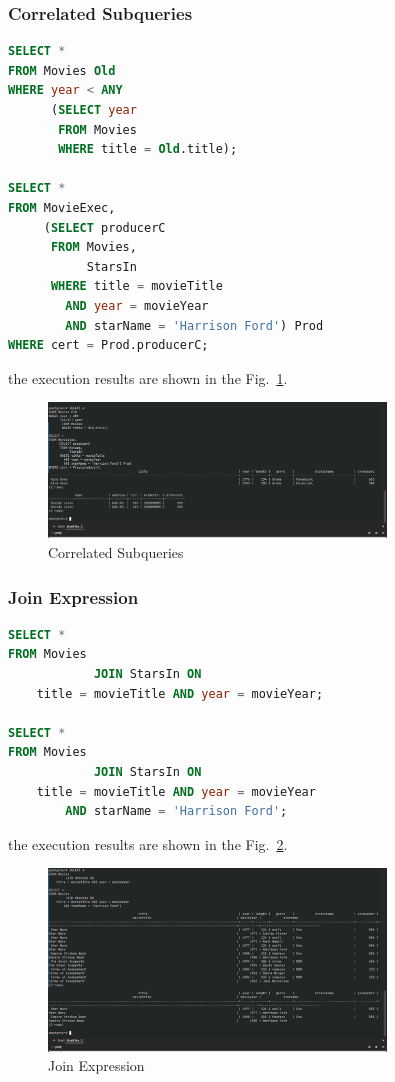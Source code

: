\documentclass{cshwk}
\begin{document}
\subsubsection{Correlated Subqueries}

\begin{lstlisting}[language=sql]
SELECT *
FROM Movies Old
WHERE year < ANY
      (SELECT year
       FROM Movies
       WHERE title = Old.title);

SELECT *
FROM MovieExec,
     (SELECT producerC
      FROM Movies,
           StarsIn
      WHERE title = movieTitle
        AND year = movieYear
        AND starName = 'Harrison Ford') Prod
WHERE cert = Prod.producerC;
\end{lstlisting}

the execution results are shown in the Fig.~\ref{fig:correlated-subqueries}.

\begin{figure}[H]
    \centering
    \includegraphics[width=0.8\textwidth]{hw5-9.png}
    \caption{Correlated Subqueries}
    \label{fig:correlated-subqueries}
\end{figure}

\subsubsection{Join Expression}

\begin{lstlisting}[language=sql]
SELECT *
FROM Movies
            JOIN StarsIn ON
    title = movieTitle AND year = movieYear;

SELECT *
FROM Movies
            JOIN StarsIn ON
    title = movieTitle AND year = movieYear
        AND starName = 'Harrison Ford';
\end{lstlisting}

the execution results are shown in the Fig.~\ref{fig:join-expression}.
\begin{figure}[H]
    \centering
    \includegraphics[width=0.8\textwidth]{hw5-10.png}
    \caption{Join Expression}
    \label{fig:join-expression}
\end{figure}
\end{document}
